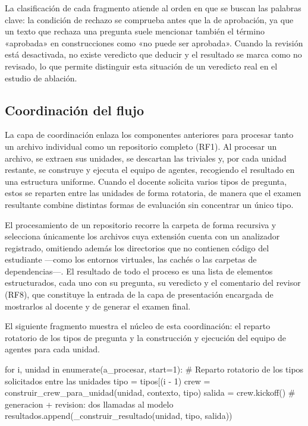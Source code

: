 La clasificación de cada fragmento atiende al orden en que se buscan las
palabras clave: la condición de rechazo se comprueba antes que la de
aprobación, ya que un texto que rechaza una pregunta suele mencionar
también el término «aprobada» en construcciones como «no puede ser
aprobada». Cuando la revisión está desactivada, no existe
veredicto que deducir y el resultado se marca como no revisado, lo que
permite distinguir esta situación de un veredicto real en el estudio de
ablación.

\subsection{Coordinación del flujo}
\label{sec:impl-pipeline}

La capa de coordinación enlaza los componentes anteriores para procesar
tanto un archivo individual como un repositorio completo (RF1). Al procesar
un archivo, se extraen sus unidades, se descartan las triviales y, por cada
unidad restante, se construye y ejecuta el equipo de agentes, recogiendo el
resultado en una estructura uniforme. Cuando el docente solicita varios
tipos de pregunta, estos se reparten entre las unidades de forma rotatoria,
de manera que el examen resultante combine distintas formas de evaluación
sin concentrar un único tipo.

El procesamiento de un repositorio recorre la carpeta de forma recursiva y
selecciona únicamente los archivos cuya extensión cuenta con un analizador
registrado, omitiendo además los directorios que no contienen código del
estudiante ---como los entornos virtuales, las cachés o las carpetas de
dependencias---. El resultado de todo el proceso es una lista de elementos
estructurados, cada uno con su pregunta, su veredicto y el comentario del
revisor (RF8), que constituye la entrada de la capa de presentación
encargada de mostrarlos al docente y de generar el examen final.

El siguiente fragmento muestra el núcleo de esta coordinación: el
reparto rotatorio de los tipos de pregunta y la construcción y ejecución del
equipo de agentes para cada unidad.

\begin{pythoncode}[title={pipeline.py --- coordinación: una pregunta por unidad}, list entry={\protect\numberline{\thelisting}Coordinación del flujo}]
for i, unidad in enumerate(a_procesar, start=1):
    # Reparto rotatorio de los tipos solicitados entre las unidades
    tipo = tipos[(i - 1) %
    crew = construir_crew_para_unidad(unidad, contexto, tipo)
    salida = crew.kickoff()   # generacion + revision: dos llamadas al modelo
    resultados.append(_construir_resultado(unidad, tipo, salida))
\end{pythoncode}

